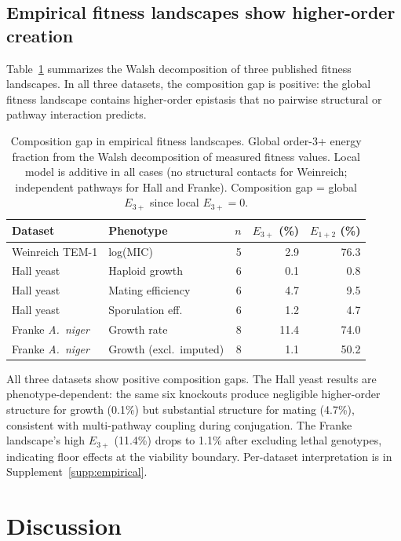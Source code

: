 \documentclass[10pt]{article}
\begin{document}
\subsection{Empirical fitness landscapes show higher-order creation}
\label{sec:empirical-results}

Table~\ref{tab:empirical} summarizes the Walsh decomposition of three
published fitness landscapes. In all three datasets, the composition
gap is positive: the global fitness landscape contains higher-order
epistasis that no pairwise structural or pathway interaction
predicts.

\begin{table}[t]
\centering
\caption{Composition gap in empirical fitness landscapes. Global
order-3+ energy fraction from the Walsh decomposition of measured
fitness values. Local model is additive in all cases (no structural
contacts for Weinreich; independent pathways for Hall and Franke).
Composition gap = global $E_{3+}$ since local $E_{3+} = 0$.}
\label{tab:empirical}
\begin{tabular}{llrrr}
\toprule
Dataset & Phenotype & $n$ & $E_{3+}$ (\%) & $E_{1+2}$ (\%) \\
\midrule
Weinreich TEM-1 & log(MIC) & 5 & 2.9 & 76.3 \\
Hall yeast & Haploid growth & 6 & 0.1 & 0.8 \\
Hall yeast & Mating efficiency & 6 & 4.7 & 9.5 \\
Hall yeast & Sporulation eff. & 6 & 1.2 & 4.7 \\
Franke \emph{A.~niger} & Growth rate & 8 & 11.4 & 74.0 \\
Franke \emph{A.~niger} & Growth (excl.\ imputed) & 8 & 1.1 & 50.2 \\
\bottomrule
\end{tabular}
\end{table}

All three datasets show positive composition gaps. The Hall yeast
results are phenotype-dependent: the same six knockouts produce
negligible higher-order structure for growth (0.1\%) but substantial
structure for mating (4.7\%), consistent with multi-pathway coupling
during conjugation. The Franke landscape's high $E_{3+}$ (11.4\%)
drops to 1.1\% after excluding lethal genotypes, indicating floor
effects at the viability boundary. Per-dataset interpretation is in
Supplement~\ref{supp:empirical}.


\section{Discussion}
\label{sec:discussion}
\end{document}
